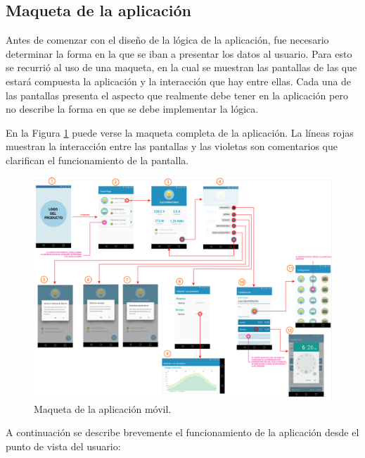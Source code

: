 \subsection{Maqueta de la aplicación}
\label{subsec:app_wireframe}

Antes de comenzar con el diseño de la lógica de la aplicación, fue necesario determinar la forma en la que se iban a presentar los datos al usuario. Para esto se recurrió al uso de una maqueta, en la cual se muestran las pantallas de las que estará compuesta la aplicación y la interacción que hay entre ellas. Cada una de las pantallas presenta el aspecto que realmente debe tener en la aplicación pero no describe la forma en que se debe implementar la lógica.

En la Figura \ref{fig:app_wireframe} puede verse la maqueta completa de la aplicación. La líneas rojas muestran la interacción entre las pantallas y las violetas son comentarios que clarifican el funcionamiento de la pantalla.

\begin{figure}[!h]
	\centering
	\includegraphics[width=18cm, angle=90]{./Figures/3_3_1_app_wireframe.png}
	\caption{Maqueta de la aplicación móvil.}
	\label{fig:app_wireframe}
\end{figure}

A continuación se describe brevemente el funcionamiento de la aplicación desde el punto de vista del usuario:


